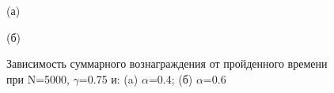 \documentclass[a4paper]{report}
\theoremstyle{definition}
\theoremstyle{plain}
\theoremstyle{remark}
\theoremstyle{remark}
\theoremstyle{definition}
\begin{document}
\begin{figure}[H]
    \begin{minipage}[H]{0.49\linewidth}
        (а)\\
    \end{minipage}
    \hfill
    \begin{minipage}[H]{0.49\linewidth}
        (б)\\
    \end{minipage}
    \caption{Зависимость суммарного вознаграждения от пройденного времени при N=5000, $\gamma$=0.75 и: (a) $\alpha$=0.4; (б) $\alpha$=0.6}
\end{figure}
\end{document}
